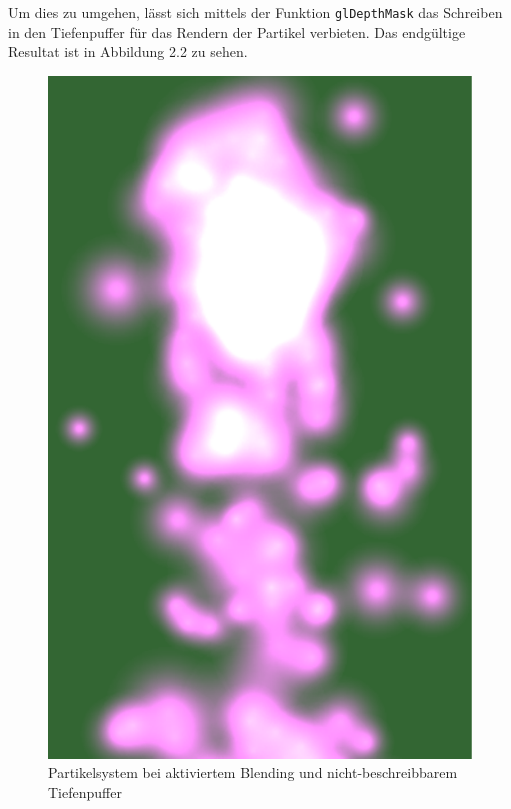 Um dies zu umgehen, lässt sich mittels der Funktion {\texttt{glDepthMask}} das Schreiben in den Tiefenpuffer für das Rendern der Partikel verbieten.
Das endgültige Resultat ist in Abbildung 2.2 zu sehen.

\begin{figure}[h]
	\centering
	\includegraphics[scale=0.4]{bilder/ParticleFinal}
	\caption{Partikelsystem bei aktiviertem Blending und nicht-beschreibbarem Tiefenpuffer}
	\label{fig:ParticleFinal}
\end{figure}
%